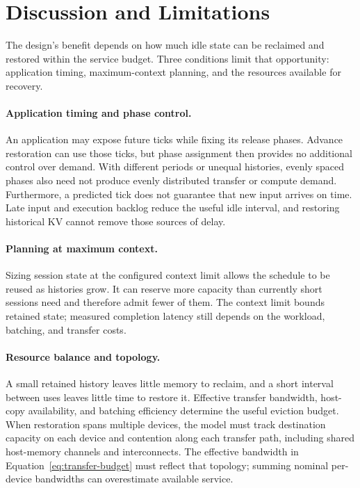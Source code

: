 \section{Discussion and Limitations}
\label{sec:discussion}

The design's benefit depends on how much idle state can be reclaimed and restored within the service budget.
Three conditions limit that opportunity: application timing, maximum-context planning, and the resources available for recovery.

\paragraph{Application timing and phase control.}
An application may expose future ticks while fixing its release phases.
Advance restoration can use those ticks, but phase assignment then provides no additional control over demand.
With different periods or unequal histories, evenly spaced phases also need not produce evenly distributed transfer or compute demand.
Furthermore, a predicted tick does not guarantee that new input arrives on time.
Late input and execution backlog reduce the useful idle interval, and restoring historical KV cannot remove those sources of delay.

\paragraph{Planning at maximum context.}
Sizing session state at the configured context limit allows the schedule to be reused as histories grow.
It can reserve more capacity than currently short sessions need and therefore admit fewer of them.
The context limit bounds retained state; measured completion latency still depends on the workload, batching, and transfer costs.

\paragraph{Resource balance and topology.}
A small retained history leaves little memory to reclaim, and a short interval between uses leaves little time to restore it.
Effective transfer bandwidth, host-copy availability, and batching efficiency determine the useful eviction budget.
When restoration spans multiple devices, the model must track destination capacity on each device and contention along each transfer path, including shared host-memory channels and interconnects.
The effective bandwidth in Equation~\ref{eq:transfer-budget} must reflect that topology; summing nominal per-device bandwidths can overestimate available service.


